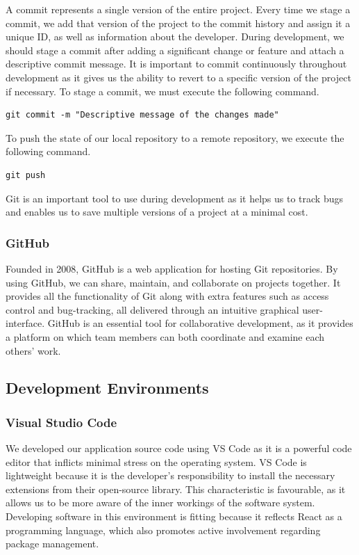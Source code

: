 A commit represents a single version of the entire project. Every time we stage a commit, we add that version of the project to the commit history and assign it a unique ID, as well as information about the developer. During development, we should stage a commit after adding a significant change or feature and attach a descriptive commit message. It is important to commit continuously throughout development as it gives us the ability to revert to a specific version of the project if necessary.  To stage a commit, we must execute the following command. 

\begin{verbatim}
git commit -m "Descriptive message of the changes made"    
\end{verbatim}
 
To push the state of our local repository to a remote repository, we execute the following command. 

\begin{verbatim}
git push  
\end{verbatim}

Git is an important tool to use during development as it helps us to track bugs and enables us to save multiple versions of a project at a minimal cost.      

\subsubsection{GitHub}
Founded in 2008, GitHub is a web application for hosting Git repositories. By using GitHub, we can share, maintain, and collaborate on projects together. It provides all the functionality of Git along with extra features such as access control and bug-tracking, all delivered through an intuitive graphical user-interface. GitHub is an essential tool for collaborative development, as it provides a platform on which team members can both coordinate and examine each others' work. 

\subsection{Development Environments} 
\subsubsection{Visual Studio Code}
We developed our application source code using VS Code as it is a powerful code editor that inflicts minimal stress on the operating system. VS Code is lightweight because it is the developer's responsibility to install the necessary extensions from their open-source library. This characteristic is favourable, as it allows us to be more aware of the inner workings of the software system. Developing software in this environment is fitting because it reflects React as a programming language, which also promotes active involvement regarding package management.   


